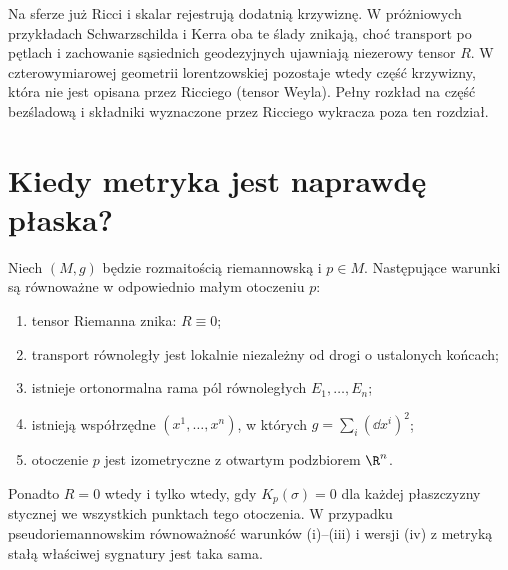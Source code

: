 \begin{uwaga}
Na sferze już Ricci i skalar rejestrują dodatnią
krzywiznę. W próżniowych przykładach Schwarzschilda
i Kerra oba te ślady znikają, choć transport po
pętlach i zachowanie sąsiednich geodezyjnych ujawniają
niezerowy tensor $R$. W czterowymiarowej geometrii
lorentzowskiej pozostaje wtedy część krzywizny,
która nie jest opisana przez Ricciego (tensor Weyla).
Pełny rozkład na część bezśladową i składniki
wyznaczone przez Ricciego wykracza poza ten rozdział.
\end{uwaga}

\section{Kiedy metryka jest naprawdę płaska?}

\begin{twierdzenie}
\label{thm:lokalna-plaskosc}
Niech $(M,g)$ będzie rozmaitością riemannowską
i $p\in M$. Następujące warunki są równoważne
w odpowiednio małym otoczeniu $p$:
\begin{enumerate}[label=\textup{(\roman*)}]
 \item tensor Riemanna znika: $R\equiv0$;
 \item transport równoległy jest lokalnie niezależny
       od drogi o ustalonych końcach;
 \item istnieje ortonormalna rama pól równoległych
       $E_1,\ldots,E_n$;
 \item istnieją współrzędne $(x^1,\ldots,x^n)$,
       w których $g=\sum_i(\dd x^i)^2$;
 \item otoczenie $p$ jest izometryczne z otwartym
       podzbiorem $\R^n$.
\end{enumerate}
Ponadto $R=0$ wtedy i tylko wtedy, gdy
$K_p(\sigma)=0$ dla każdej płaszczyzny stycznej
we wszystkich punktach tego otoczenia.
W przypadku pseudoriemannowskim równoważność
warunków \textup{(i)--(iii)} i wersji \textup{(iv)}
z metryką stałą właściwej sygnatury jest taka sama.
\end{twierdzenie}

